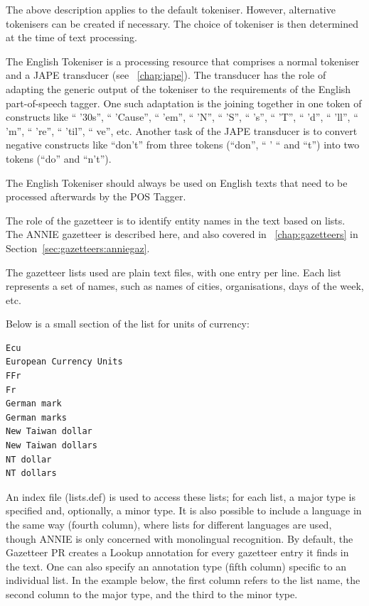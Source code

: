 The above description applies to the default tokeniser. However,
alternative tokenisers can be created if necessary. The choice of
tokeniser is then determined at the time of text processing.


The English Tokeniser is a processing resource that comprises a normal
tokeniser and a JAPE transducer (see \Chapthing~\ref{chap:jape}). The
transducer has the role of adapting the generic output of the
tokeniser to the requirements of the English part-of-speech
tagger. One such adaptation is the joining together in one token of
constructs like `` '30s'', `` 'Cause'', `` 'em'', `` 'N'', `` 'S'', ``
's'', `` 'T'', `` 'd'', `` 'll'', `` 'm'', `` 're'', `` 'til'', ``
ve'', etc. Another task of the JAPE transducer is to convert negative
constructs like ``don't'' from three tokens (``don'', `` ' `` and
``t'') into two tokens (``do'' and ``n't'').

The English Tokeniser should always be used on English texts that need
to be processed afterwards by the POS Tagger.



The role of the gazetteer is to identify entity names in the text based on
lists. The ANNIE gazetteer is described here, and also covered in
\Chapthing~\ref{chap:gazetteers} in Section~\ref{sec:gazetteers:anniegaz}.

The gazetteer lists used are plain text files, with one entry per
line. Each list represents a set of names, such as names
of cities, organisations, days of the week, etc.

Below is a small section of the list for units of currency:
\begin{small}
\begin{verbatim}
Ecu
European Currency Units
FFr
Fr
German mark
German marks
New Taiwan dollar
New Taiwan dollars
NT dollar
NT dollars
\end{verbatim}
\end{small}

An index file (lists.def) is used to access these lists; for each list, a
major type is specified and, optionally, a minor type. It is also
possible to include a language in the same way (fourth column), 
where lists for different languages are used, though ANNIE is 
only concerned with monolingual recognition.  By default, the 
Gazetteer PR creates a Lookup annotation for every gazetteer
entry it finds in the text.  One can also specify an annotation type
(fifth column) specific to an individual list.  In the example below, 
the first column refers to the list name, the second column to the
major type, and the third to the minor type.

